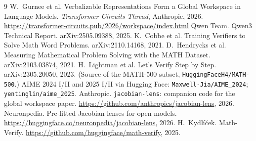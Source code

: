 \documentclass[11pt]{article}
\begin{document}
\begin{thebibliography}{9}\small
{} W.~Gurnee et al. Verbalizable Representations Form a Global Workspace in Language Models. \emph{Transformer Circuits Thread}, Anthropic, 2026. \url{https://transformer-circuits.pub/2026/workspace/index.html}
 Qwen Team. Qwen3 Technical Report. arXiv:2505.09388, 2025.
 K.~Cobbe et al. Training Verifiers to Solve Math Word Problems. arXiv:2110.14168, 2021.
 D.~Hendrycks et al. Measuring Mathematical Problem Solving with the MATH Dataset. arXiv:2103.03874, 2021.
 H.~Lightman et al. Let's Verify Step by Step. arXiv:2305.20050, 2023. (Source of the MATH-500 subset, \texttt{HuggingFaceH4/MATH-500}.)
 AIME 2024 I/II and 2025 I/II via Hugging Face: \texttt{Maxwell-Jia/AIME\_2024}; \texttt{yentinglin/aime\_2025}.
 Anthropic. \texttt{jacobian-lens}: companion code for the global workspace paper. \url{https://github.com/anthropics/jacobian-lens}, 2026.
 Neuronpedia. Pre-fitted Jacobian lenses for open models. \url{https://huggingface.co/neuronpedia/jacobian-lens}, 2026.
 H.~Kydl\'i\v{c}ek. Math-Verify. \url{https://github.com/huggingface/math-verify}, 2025.
\end{thebibliography}
\end{document}
